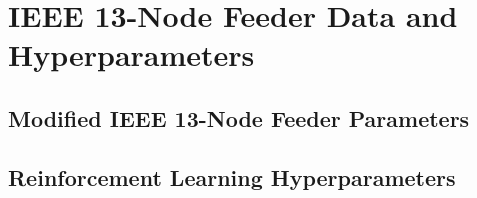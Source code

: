 \chapter{IEEE 13-Node Feeder Data and Hyperparameters}
\label{app:parameters}

\section{Modified IEEE 13-Node Feeder Parameters}

\section{Reinforcement Learning Hyperparameters}
